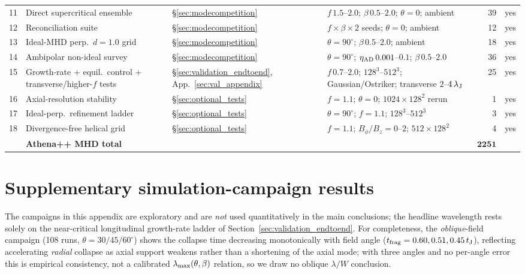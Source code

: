\documentclass[usenatbib,twoside,twocolumn]{mnras}
\begin{document}
\begin{table}
\begin{tabular}{@{}c p{3.4cm} l p{4.0cm} r l@{}}
11 & Direct supercritical ensemble & \S\ref{sec:modecompetition} & $f\,1.5$--$2.0$; $\beta\,0.5$--$2.0$; $\theta=0$; ambient & 39 & yes \\
12 & Reconciliation suite & \S\ref{sec:modecompetition} & $f\times\beta\times2$ seeds; $\theta=0$; ambient & 12 & yes \\
13 & Ideal-MHD perp.\ $d=1.0$ grid & \S\ref{sec:modecompetition} & $\theta=90^\circ$; $\beta\,0.5$--$2.0$; ambient & 18 & yes \\
14 & Ambipolar non-ideal survey & \S\ref{sec:modecompetition} & $\theta=90^\circ$; $\eta_{\rm AD}\,0.001$--$0.1$; $\beta\,0.5$--$2.0$ & 36 & yes \\
15 & Growth-rate + equil.\ control + transverse/higher-$f$ tests & \S\ref{sec:validation_endtoend}, App.~\ref{sec:val_appendix} & $f\,0.7$--$2.0$; $128^3$--$512^3$; Gaussian/Ostriker; transverse $2$--$4\,\lambda_{\rm J}$ & 25 & yes \\
16 & Axial-resolution stability & \S\ref{sec:optional_tests} & $f=1.1$; $\theta=0$; $1024\times128^2$ rerun & 1 & yes \\
17 & Ideal-perp.\ refinement ladder & \S\ref{sec:optional_tests} & $\theta=90^\circ$; $f=1.1$; $128^3$--$512^3$ & 3 & yes \\
18 & Divergence-free helical grid & \S\ref{sec:optional_tests} & $f=1.1$; $B_\phi/B_z=0$--$2$; $512\times128^2$ & 4 & yes \\
\midrule
   & \textbf{Athena++ MHD total} & & & $\boldsymbol{2251}$ & \\
\bottomrule
\end{tabular}
\end{table}

\section{Supplementary simulation-campaign results}
\label{sec:supplementary_campaigns_app}

The campaigns in this appendix are exploratory and are \emph{not} used quantitatively in the main conclusions; the headline wavelength rests solely on the near-critical longitudinal growth-rate ladder of Section~\ref{sec:validation_endtoend}. For completeness, the \emph{oblique}-field campaign (108 runs, $\theta=30/45/60^\circ$) shows the collapse time decreasing monotonically with field angle ($t_{\rm frag}=0.60,0.51,0.45\,t_{\rm J}$), reflecting accelerating \emph{radial} collapse as axial support weakens rather than a shortening of the axial mode; with three angles and no per-angle error this is empirical consistency, not a calibrated $\lambda_{\rm max}(\theta,\beta)$ relation, so we draw no oblique $\lambda/W$ conclusion.
\end{document}
